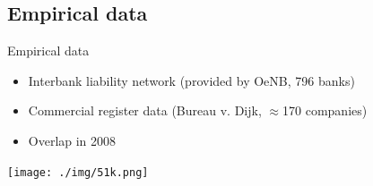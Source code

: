 \documentclass[]{beamer}
\begin{document}
\subsection{Empirical data}
\begin{frame}{Empirical data}
	\begin{itemize}[<+-|alert@+>]
		\item Interbank liability network (provided by OeNB, 796 banks)
		\item Commercial register data (Bureau v. Dijk, $\approx$170 companies)
		\item Overlap in 2008
	\end{itemize}

\end{frame}

\begin{frame}[plain]
	\begin{center}
		\texttt{[image: ./img/51k.png]}
	\end{center}
\end{frame}


\end{document}

